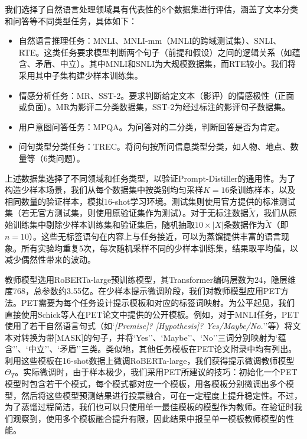 \documentclass[../main.tex]{subfiles}
\begin{document}
\label{sec:3-5-1}


我们选择了自然语言处理领域具有代表性的8个数据集进行评估，涵盖了文本分类和问答等不同类型任务，具体如下：
\begin{itemize}
	\item 自然语言推理任务：MNLI、MNLI-mm（MNLI的跨域测试集）、SNLI、RTE。这类任务要求模型判断两个句子（前提和假设）之间的逻辑关系（如蕴含、矛盾、中立）。其中MNLI和SNLI为大规模数据集，而RTE较小。我们将采用其中子集构建少样本训练集。
	\item 情感分析任务：MR、SST-2。要求判断给定文本（影评）的情感极性（正面或负面）。MR为影评二分类数据集，SST-2为经过标注的影评句子数据集。
	\item 用户意图问答任务：MPQA。为问答对的二分类，判断回答是否为肯定。
	\item 问句类型分类任务：TREC。将问句按所问信息类型分类，如人物、地点、数量等（6类问题）。
\end{itemize}
上述数据集选择了不同领域和任务类型，以验证Prompt-Distiller的通用性。为了构造少样本场景，我们从每个数据集中按类别均匀采样$K=16$条训练样本，以及相同数量的验证样本，模拟16-shot学习环境。测试集则使用官方提供的标准测试集（若无官方测试集，则使用原验证集作为测试）。对于无标注数据$\tilde{X}$，我们从原始训练集中剔除少样本训练集和验证集后，随机抽取$10 \times |X|$条数据作为$\tilde{X}$（即$n=10$）。这些无标签语句在内容上与任务接近，可以为蒸馏提供丰富的语言现象。所有实验均重复5次，每次随机采样不同的少样本训练集，结果取平均值，以减少偶然性带来的波动。


教师模型选用RoBERTa-large预训练模型，其Transformer编码层数为24，隐层维度768，总参数约3.55亿。在少样本提示微调阶段，我们对教师模型应用PET方法。PET需要为每个任务设计提示模板和对应的标签词映射。为公平起见，我们直接使用Schick等人在PET论文中提供的公开模板。例如，对于MNLI任务，PET使用了若干自然语言句式（如`\textit{[Premise]? [Hypothesis]? Yes/Maybe/No.}''等）将文本对转换为带[MASK]的句子，并将`Yes''、`Maybe''、`No''三词分别映射为`蕴含''、`中立''、`矛盾''三类。类似地，其他任务模板在PET论文附录中均有列出。利用这些模板在16-shot数据上微调RoBERTa-large，我们获得提示微调教师模型$\Theta_T$。实际微调时，由于样本极少，我们采用PET所建议的技巧：初始化一个PET模型时包含若干个模式，每个模式都对应一个模板，用各模板分别微调出多个模型，然后将这些模型预测结果进行投票融合，可在一定程度上提升稳定性。不过，为了蒸馏过程简洁，我们也可以只使用单一最佳模板的模型作为教师。在验证时我们观察到，使用多个模板融合提升有限，因此结果中报呈单一模板教师模型的性能。
\end{document}
